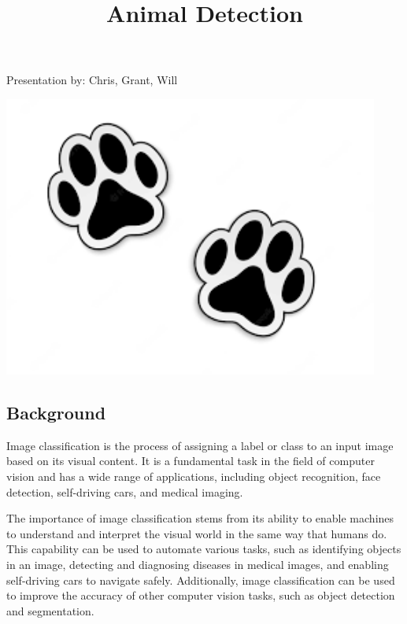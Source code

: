 \documentclass[
  letterpaper,
  DIV=11,
  numbers=noendperiod]{scrartcl}
\title{Animal Detection}
\author{}
\date{}
\begin{document}
\maketitle
\ifdefined\Shaded\renewenvironment{Shaded}{\begin{tcolorbox}[breakable, enhanced, boxrule=0pt, interior hidden, frame hidden, sharp corners, borderline west={3pt}{0pt}{shadecolor}]}{\end{tcolorbox}}\fi

Presentation by: Chris, Grant, Will

\includegraphics[width=\textwidth,height=3.64583in]{paws.png}

\hypertarget{background}{%
\subsection{Background}\label{background}}

Image classification is the process of assigning a label or class to an
input image based on its visual content. It is a fundamental task in the
field of computer vision and has a wide range of applications, including
object recognition, face detection, self-driving cars, and medical
imaging.

The importance of image classification stems from its ability to enable
machines to understand and interpret the visual world in the same way
that humans do. This capability can be used to automate various tasks,
such as identifying objects in an image, detecting and diagnosing
diseases in medical images, and enabling self-driving cars to navigate
safely. Additionally, image classification can be used to improve the
accuracy of other computer vision tasks, such as object detection and
segmentation.
\end{document}
